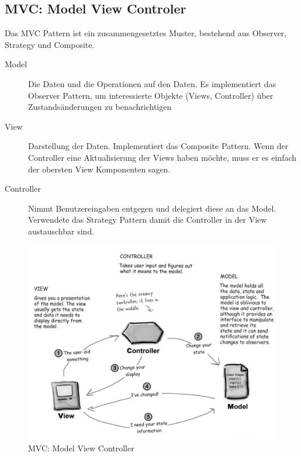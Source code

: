 \clearpage

\subsection{MVC: Model View Controler}
\label{sec:mvc}
Das MVC Pattern ist ein zusammengesetztes Muster, bestehend aus Observer, Strategy und Composite.
\begin{description}
	\item[Model] Die Daten und die Operationen auf den Daten. Es implementiert das Observer Pattern, um interessierte Objekte (Views, Controller) über Zustandsänderungen zu benachrichtigen
	\item[View] Darstellung der Daten. Implementiert das Composite Pattern. Wenn der Controller eine Aktualisierung der Views haben möchte, muss er es einfach der obersten View Komponenten sagen.
	\item[Controller] Nimmt Benutzereingaben entgegen und delegiert diese an das Model. Verwendete das Strategy Pattern damit die Controller in der View austauschbar sind.
\end{description}


\begin{figure}[h]
	\centering
	\includegraphics[width=0.7\linewidth]{images/mvc_pattern}
	\caption{MVC: Model View Controller}
	\label{fig:mvcpattern}
\end{figure}

\clearpage

